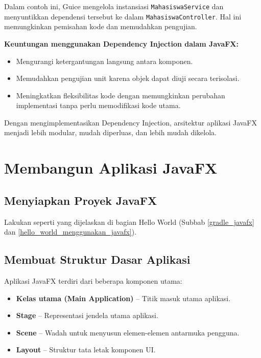 Dalam contoh ini, Guice mengelola instansiasi \texttt{MahasiswaService} dan menyuntikkan dependensi tersebut ke dalam \texttt{MahasiswaController}. Hal ini memungkinkan pemisahan kode dan memudahkan pengujian.

\textbf{Keuntungan menggunakan Dependency Injection dalam JavaFX:}
\begin{itemize}
\item Mengurangi ketergantungan langsung antara komponen.
\item Memudahkan pengujian unit karena objek dapat diuji secara terisolasi.
\item Meningkatkan fleksibilitas kode dengan memungkinkan perubahan implementasi tanpa perlu memodifikasi kode utama.
\end{itemize}

Dengan mengimplementasikan Dependency Injection, arsitektur aplikasi JavaFX menjadi lebih modular, mudah diperluas, dan lebih mudah dikelola.



\section{Membangun Aplikasi JavaFX}

\subsection{Menyiapkan Proyek JavaFX}

Lakukan seperti yang dijelaskan di bagian Hello World (Subbab \ref{gradle_javafx} dan \ref{hello_world_menggunakan_javafx}).

\subsection{Membuat Struktur Dasar Aplikasi}

Aplikasi JavaFX terdiri dari beberapa komponen utama:
\begin{itemize}
\item \textbf{Kelas utama (Main Application)} – Titik masuk utama aplikasi.
\item \textbf{Stage} – Representasi jendela utama aplikasi.
\item \textbf{Scene} – Wadah untuk menyusun elemen-elemen antarmuka pengguna.
\item \textbf{Layout} – Struktur tata letak komponen UI.
\end{itemize}



